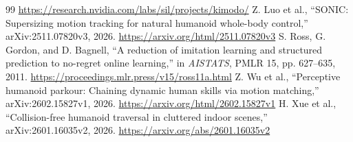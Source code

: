 \documentclass[10pt]{article}
\begin{document}
\begin{thebibliography}{99}
\url{https://research.nvidia.com/labs/sil/projects/kimodo/}
 Z. Luo et al., ``SONIC: Supersizing motion tracking for natural
humanoid whole-body control,'' arXiv:2511.07820v3, 2026.
\url{https://arxiv.org/html/2511.07820v3}
 S. Ross, G. Gordon, and D. Bagnell, ``A reduction of imitation
learning and structured prediction to no-regret online learning,'' in
\emph{AISTATS}, PMLR 15, pp. 627--635, 2011.
\url{https://proceedings.mlr.press/v15/ross11a.html}
 Z. Wu et al., ``Perceptive humanoid parkour: Chaining dynamic human
skills via motion matching,'' arXiv:2602.15827v1, 2026.
\url{https://arxiv.org/html/2602.15827v1}
 H. Xue et al., ``Collision-free humanoid traversal in
cluttered indoor scenes,'' arXiv:2601.16035v2, 2026.
\url{https://arxiv.org/abs/2601.16035v2}
\end{thebibliography}
\end{document}
